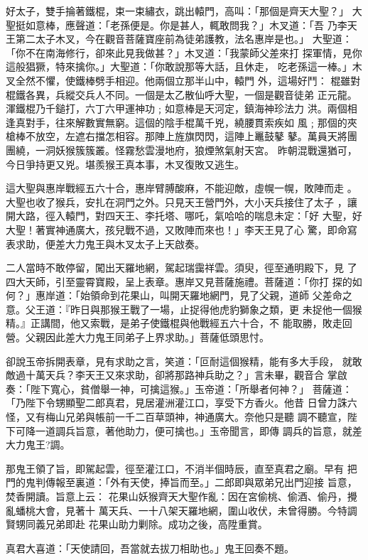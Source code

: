 \begin{pinyinscope}
{好太子，雙手掄著鐵棍，束一束繡衣，跳出轅門，高叫：「那個是齊天大聖？」
大聖挺如意棒，應聲道：「老孫便是。你是甚人，輒敢問我？」木叉道：「吾
乃李天王第二太子木叉，今在觀音菩薩寶座前為徒弟護教，法名惠岸是也。」
大聖道：「你不在南海修行，卻來此見我做甚？」木叉道：「我蒙師父差來打
探軍情，見你這般猖獗，特來擒你。」大聖道：「你敢說那等大話，且休走，
吃老孫這一棒。」木叉全然不懼，使鐵棒劈手相迎。他兩個立那半山中，轅門
外，這場好鬥：
棍雖對棍鐵各異，兵縱交兵人不同。一個是太乙散仙呼大聖，一個是觀音徒弟
正元龍。渾鐵棍乃千鎚打，六丁六甲運神功﹔如意棒是天河定，鎮海神珍法力
洪。兩個相逢真對手，往來解數實無窮。這個的陰手棍萬千兇，繞腰貫索疾如
風﹔那個的夾槍棒不放空，左遮右擋怎相容。那陣上旌旗閃閃，這陣上鼉鼓鼕
鼕。萬員天將團團繞，一洞妖猴簇簇叢。怪霧愁雲漫地府，狼煙煞氣射天宮。
昨朝混戰還猶可，今日爭持更又兇。堪羨猴王真本事，木叉復敗又逃生。

這大聖與惠岸戰經五六十合，惠岸臂膊酸麻，不能迎敵，虛幌一幌，敗陣而走
。大聖也收了猴兵，安扎在洞門之外。只見天王營門外，大小天兵接住了太子
，讓開大路，徑入轅門，對四天王、李托塔、哪吒，氣哈哈的喘息未定：「好
大聖，好大聖！著實神通廣大，孩兒戰不過，又敗陣而來也！」李天王見了心
驚，即命寫表求助，便差大力鬼王與木叉太子上天啟奏。

二人當時不敢停留，闖出天羅地網，駕起瑞靄祥雲。須臾，徑至通明殿下，見
了四大天師，引至靈霄寶殿，呈上表章。惠岸又見菩薩施禮。菩薩道：「你打
探的如何？」惠岸道：「始領命到花果山，叫開天羅地網門，見了父親，道師
父差命之意。父王道：『昨日與那猴王戰了一場，止捉得他虎豹獅象之類，更
未捉他一個猴精。』正講間，他又索戰，是弟子使鐵棍與他戰經五六十合，不
能取勝，敗走回營。父親因此差大力鬼王同弟子上界求助。」菩薩低頭思忖。

卻說玉帝拆開表章，見有求助之言，笑道：「叵耐這個猴精，能有多大手段，
就敢敵過十萬天兵？李天王又來求助，卻將那路神兵助之？」言未畢，觀音合
掌啟奏：「陛下寬心，貧僧舉一神，可擒這猴。」玉帝道：「所舉者何神？」
菩薩道：「乃陛下令甥顯聖二郎真君，見居灌洲灌江口，享受下方香火。他昔
日曾力誅六怪，又有梅山兄弟與帳前一千二百草頭神，神通廣大。奈他只是聽
調不聽宣，陛下可降一道調兵旨意，著他助力，便可擒也。」玉帝聞言，即傳
調兵的旨意，就差大力鬼王?調。

那鬼王領了旨，即駕起雲，徑至灌江口，不消半個時辰，直至真君之廟。早有
把門的鬼判傳報至裏道：「外有天使，捧旨而至。」二郎即與眾弟兄出門迎接
旨意，焚香開讀。旨意上云：
花果山妖猴齊天大聖作亂：因在宮偷桃、偷酒、偷丹，攪亂蟠桃大會，見著十
萬天兵、一十八架天羅地網，圍山收伏，未曾得勝。今特調賢甥同義兄弟即赴
花果山助力剿除。成功之後，高陞重賞。

真君大喜道：「天使請回，吾當就去拔刀相助也。」鬼王回奏不題。

}
\end{pinyinscope}
